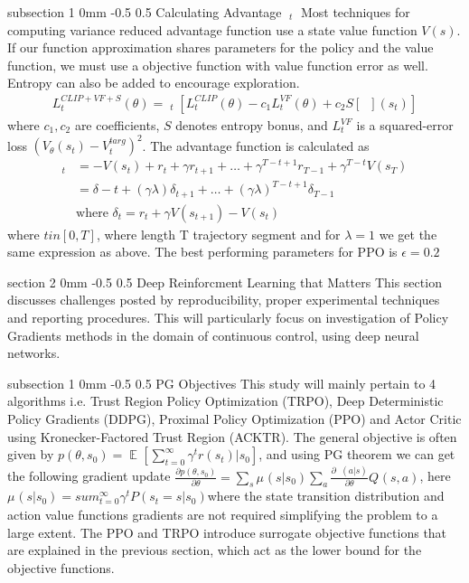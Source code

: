 \documentclass[twocolumn,11pt]{article}
\makeatletter
\DeclareMathOperator{\E}{\mathbb{E}}
\DeclareMathOperator{\eE}{\hat{E}} %
\DeclareMathOperator{\pit}{\pi_\theta}
\DeclareMathOperator{\eA}{\bar{A}} %
\renewcommand{\section}{\@startsection
{section}%
{2}%
{0mm}%
{-0.5\baselineskip}%
{0.5\baselineskip}%
{\bfseries\color{blue}}} %
\renewcommand{\subsection}{\@startsection
{subsection}%
{1}%
{0mm}%
{-0.5\baselineskip}%
{0.5\baselineskip}%
{\bfseries\color{blue}}} %
\makeatother
\begin{document}
\subsection{Calculating Advantage $\eA_t$}
Most techniques for computing variance reduced advantage function use a state value function $V(s)$. If our function approximation shares parameters for the policy and the value function, we must use a objective function with value function error as well. Entropy can also be added to encourage exploration.
\begin{align*}
L_t^{CLIP + VF + S}(\theta) = \eE_t \left[ L_t^{CLIP}(\theta)  - c_1 L_t^{VF} (\theta) + c_2 S[\pit ](s_t)\right]
\end{align*}
where $c_1, c_2$ are coefficients, $S$ denotes entropy bonus, and $L_t^{VF}$ is a squared-error loss $(V_\theta (s_t) - V_t^{targ})^2$. The advantage function is calculated as 
\begin{align*}
\eA_t &= -V(s_t) + r_t + \gamma r_{t+1} + \dots + \gamma^{T-t + 1}r_{T-1} + \gamma ^{T-t}V(s_T)\\
&= \delta-t + (\gamma\lambda)\delta_{t+1} + \dots + (\gamma \lambda)^{T - t + 1}\delta_{T-1}\\
& \text{where } \delta_t = r_t + \gamma V(s_{t+1}) - V(s_t)
\end{align*}
where $t in [0,T]$, where length T trajectory segment and for $\lambda = 1$ we get the same expression as above. The best performing parameters for PPO is $\epsilon = 0.2$

\section{Deep Reinforcment Learning that Matters}
This section discusses challenges posted by reproducibility, proper experimental techniques and reporting procedures. This will particularly focus on investigation of Policy Gradients methods in the domain of continuous control, using deep neural networks.

\subsection{PG Objectives}
This study will mainly pertain to 4 algorithms i.e. Trust Region Policy Optimization (TRPO), Deep Deterministic Policy Gradients (DDPG), Proximal Policy Optimization (PPO) and Actor Critic using Kronecker-Factored Trust Region (ACKTR). The general objective is  often given  by $p(\theta,s_0) = \E_{\pit} [ \sum_{t=0}^{\infty} \gamma^t r(s_t) | s_0]$, and using PG theorem we can get the following gradient update $\tfrac{\partial p(\theta, s_0)}{\partial \theta} = \sum_s \mu_{\pit} (s | s_0) \sum_a \tfrac{\partial \pit (a|s)}{\partial \theta } Q_{\pit} (s,a)$, here $\mu_{\pit} (s|s_0) = sum_{t=0}^{\infty} \gamma^t P(s_t = s | s_0)$where the state transition distribution and action value functions gradients are not required simplifying the problem to a large extent. The PPO and TRPO introduce surrogate objective functions that are explained in the previous section, which act as the lower bound for the objective functions.
\end{document}
